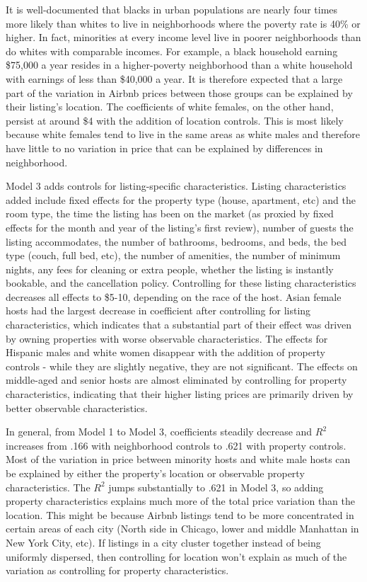 \documentclass[11pt, oneside]{article}
\begin{document}
It is well-documented that blacks in urban populations are nearly four times more likely than whites to live in neighborhoods where the poverty rate is 40\% or higher.\cite{firebaugh} In fact, minorities at every income level live in poorer neighborhoods than do whites with comparable incomes. For example, a black household earning \$75,000 a year resides in a higher-poverty neighborhood than a white household with earnings of less than \$40,000 a year.\cite{logan} It is therefore expected that a large part of the variation in Airbnb prices between those groups can be explained by their listing's location. The coefficients of white females, on the other hand, persist at around \$4 with the addition of location controls. This is most likely because white females tend to live in the same areas as white males and therefore have little to no variation in price that can be explained by differences in neighborhood.  

Model 3 adds controls for listing-specific characteristics. Listing characteristics added include fixed effects for the property type (house, apartment, etc) and the room type, the time the listing has been on the market (as proxied by fixed effects for the month and year of the listing's first review), number of guests the listing accommodates, the number of bathrooms, bedrooms, and beds, the bed type (couch, full bed, etc), the number of amenities, the number of minimum nights, any fees for cleaning or extra people, whether the listing is instantly bookable, and the cancellation policy. Controlling for these listing characteristics decreases all effects to \$5-10, depending on the race of the host. Asian female hosts had the largest decrease in coefficient after controlling for listing characteristics, which indicates that a substantial part of their effect was driven by owning properties with worse observable characteristics. The effects for Hispanic males and white women disappear with the addition of property controls - while they are slightly negative, they are not significant. The effects on middle-aged and senior hosts are almost eliminated by controlling for property characteristics, indicating that their higher listing prices are primarily driven by better observable characteristics. 

In general, from Model 1 to Model 3, coefficients steadily decrease and $R^2$ increases from .166 with neighborhood controls to .621 with property controls. Most of the variation in price between minority hosts and white male hosts can be explained by either the property's location or observable property characteristics. The $R^2$ jumps substantially to .621 in Model 3, so adding property characteristics explains much more of the total price variation than the location. This might be because Airbnb listings tend to be more concentrated in certain areas of each city (North side in Chicago, lower and middle Manhattan in New York City, etc). If listings in a city cluster together instead of being uniformly dispersed, then controlling for location won't explain as much of the variation as controlling for property characteristics.   
\end{document}
